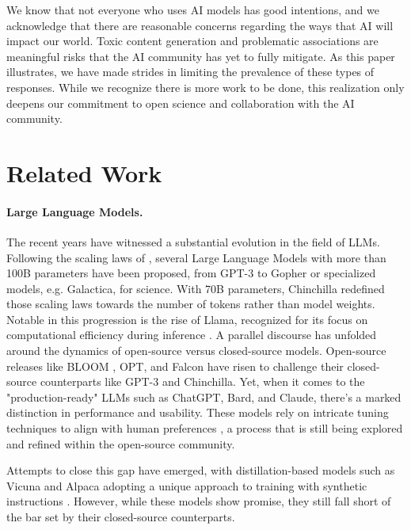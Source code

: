 \documentclass{article}
\begin{document}
We know that not everyone who uses AI models has good intentions, and we acknowledge that there are reasonable concerns regarding the ways that AI will impact our world. Toxic content generation and problematic associations are meaningful risks that the AI community has yet to fully mitigate. As this paper illustrates, we have made strides in limiting the prevalence of these types of responses. While we recognize there is more work to be done, this realization only deepens our commitment to open science and collaboration with the AI community.

\section{Related Work}
\label{sec:related_works}

\paragraph{Large Language Models.}
The recent years have witnessed a substantial evolution in the field of LLMs. Following the scaling laws of \citet{kaplan2020scaling}, several Large Language Models with more than 100B parameters have been proposed, from GPT-3 \citep{gpt3} to Gopher \citep{rae2022scaling} or specialized models, e.g. Galactica, for science\citep{taylor2022galactica}. With 70B parameters, Chinchilla \citep{hoffmann2022training} redefined those scaling laws towards the number of tokens rather than model weights. Notable in this progression is the rise of Llama, recognized for its focus on computational efficiency during inference \citep{Touvron2023LLaMAOA}. A parallel discourse has unfolded around the dynamics of open-source versus closed-source models. Open-source releases like BLOOM \citep{scao2022bloom}, OPT\citep{zhang2022opt}, and Falcon \citep{penedo2023refinedweb} have risen to challenge their closed-source counterparts like GPT-3 and Chinchilla. Yet, when it comes to the "production-ready" LLMs such as ChatGPT, Bard, and Claude, there's a marked distinction in performance and usability. These models rely on intricate tuning techniques to align with human preferences \citep{gudibande2023false}, a process that is still being explored and refined within the open-source community.

Attempts to close this gap have emerged, with distillation-based models such as Vicuna \citep{vicuna2023} and Alpaca \citep{alpaca} adopting a unique approach to training with synthetic instructions \citep{honovich2022unnatural, wang2022self}. However, while these models show promise, they still fall short of the bar set by their closed-source counterparts.
\end{document}
